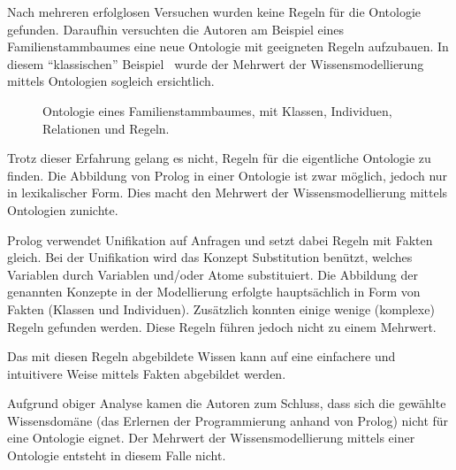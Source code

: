 Nach mehreren erfolglosen Versuchen wurden keine Regeln für die Ontologie gefunden. Daraufhin versuchten die Autoren am Beispiel eines Familienstammbaumes eine neue Ontologie mit geeigneten Regeln aufzubauen. In diesem ``klassischen'' Beispiel~\cite[S. 152]{laemmel} wurde der Mehrwert der Wissensmodellierung mittels Ontologien sogleich ersichtlich.

\begin{figure}[H]
\centering {}
\caption{Ontologie eines Familienstammbaumes, mit Klassen, Individuen, Relationen und Regeln.\label{fig:familien_netz}\protect\footnotemark}
\end{figure}

Trotz dieser Erfahrung gelang es nicht, Regeln für die eigentliche Ontologie zu finden. Die Abbildung von Prolog in einer Ontologie ist zwar möglich, jedoch nur in lexikalischer Form. Dies macht den Mehrwert der Wissensmodellierung mittels Ontologien zunichte.

Prolog verwendet Unifikation auf Anfragen und setzt dabei Regeln mit Fakten gleich. Bei der Unifikation wird das Konzept Substitution benützt, welches Variablen durch Variablen und/oder Atome substituiert. Die Abbildung der genannten Konzepte in der Modellierung erfolgte hauptsächlich in Form von Fakten (Klassen und Individuen). Zusätzlich konnten einige wenige (komplexe) Regeln gefunden werden. Diese Regeln führen jedoch nicht zu einem Mehrwert.

Das mit diesen Regeln abgebildete Wissen kann auf eine einfachere und intuitivere Weise mittels Fakten abgebildet werden.

Aufgrund obiger Analyse kamen die Autoren zum Schluss, dass sich die gewählte Wissensdomäne (das Erlernen der Programmierung anhand von Prolog) nicht für eine Ontologie eignet. Der Mehrwert der Wissensmodellierung mittels einer Ontologie entsteht in diesem Falle nicht.

